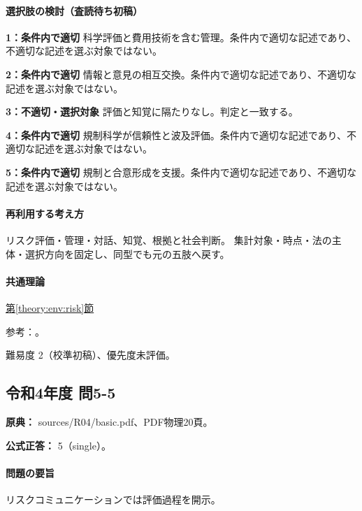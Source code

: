 \paragraph{選択肢の検討（査読待ち初稿）}\mbox{}\par

\noindent\textbf{1：条件内で適切} 科学評価と費用技術を含む管理。条件内で適切な記述であり、不適切な記述を選ぶ対象ではない。\par

\noindent\textbf{2：条件内で適切} 情報と意見の相互交換。条件内で適切な記述であり、不適切な記述を選ぶ対象ではない。\par

\noindent\textbf{3：不適切・選択対象} 評価と知覚に隔たりなし。判定と一致する。\par

\noindent\textbf{4：条件内で適切} 規制科学が信頼性と波及評価。条件内で適切な記述であり、不適切な記述を選ぶ対象ではない。\par

\noindent\textbf{5：条件内で適切} 規制と合意形成を支援。条件内で適切な記述であり、不適切な記述を選ぶ対象ではない。\par

\paragraph{再利用する考え方} リスク評価・管理・対話、知覚、根拠と社会判断。 集計対象・時点・法の主体・選択方向を固定し、同型でも元の五肢へ戻す。

\paragraph{共通理論} \hyperref[theory:env:risk]{第\ref*{theory:env:risk}節}

\par 参考：\cite{eth54_riskcomm}。

\par 難易度 2（校準初稿）、優先度未評価。

\subsection{令和4年度 問5-5}
\label{q:r04-reg-basic-5-5}

\noindent\textbf{原典：} sources/R04/basic.pdf、PDF物理20頁。

\textbf{公式正答：} 5（single）。

\paragraph{問題の要旨} リスクコミュニケーションでは評価過程を開示。

